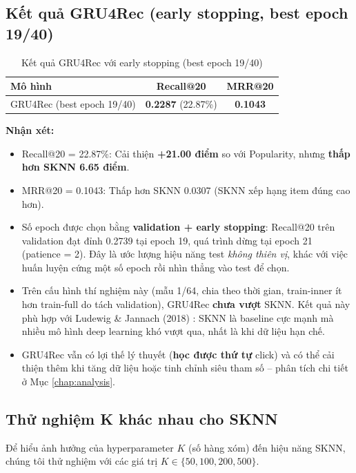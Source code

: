 \documentclass[12pt, a4paper]{article}
\begin{document}
\subsection{Kết quả GRU4Rec (early stopping, best epoch 19/40)}

\begin{table}[H]
\centering
\caption{Kết quả GRU4Rec với early stopping (best epoch 19/40)}
\label{tab:gru4rec_results}
\begin{tabular}{lcc}
\toprule
\textbf{Mô hình} & \textbf{Recall@20} & \textbf{MRR@20} \\
\midrule
GRU4Rec (best epoch 19/40) & \textbf{0.2287} (22.87\%) & \textbf{0.1043} \\
\bottomrule
\end{tabular}
\end{table}

\textbf{Nhận xét:}
\begin{itemize}
    \item Recall@20 = 22.87\%: Cải thiện \textbf{+21.00 điểm} so với Popularity, nhưng \textbf{thấp hơn SKNN 6.65 điểm}.
    \item MRR@20 = 0.1043: Thấp hơn SKNN 0.0307 (SKNN xếp hạng item đúng cao hơn).
    \item Số epoch được chọn bằng \textbf{validation + early stopping}: Recall@20 trên validation đạt đỉnh 0.2739 tại epoch 19, quá trình dừng tại epoch 21 (patience = 2). Đây là ước lượng hiệu năng test \emph{không thiên vị}, khác với việc huấn luyện cứng một số epoch rồi nhìn thẳng vào test để chọn.
    \item Trên cấu hình thí nghiệm này (mẫu 1/64, chia theo thời gian, train-inner ít hơn train-full do tách validation), GRU4Rec \textbf{chưa vượt} SKNN. Kết quả này phù hợp với Ludewig \& Jannach (2018) \cite{ludewig2018}: SKNN là baseline cực mạnh mà nhiều mô hình deep learning khó vượt qua, nhất là khi dữ liệu hạn chế.
    \item GRU4Rec vẫn có lợi thế lý thuyết (\textbf{học được thứ tự} click) và có thể cải thiện thêm khi tăng dữ liệu hoặc tinh chỉnh siêu tham số -- phân tích chi tiết ở Mục \ref{chap:analysis}.
\end{itemize}


\subsection{Thử nghiệm K khác nhau cho SKNN}

Để hiểu ảnh hưởng của hyperparameter $K$ (số hàng xóm) đến hiệu năng SKNN, chúng tôi thử nghiệm với các giá trị $K \in \{50, 100, 200, 500\}$.
\end{document}
